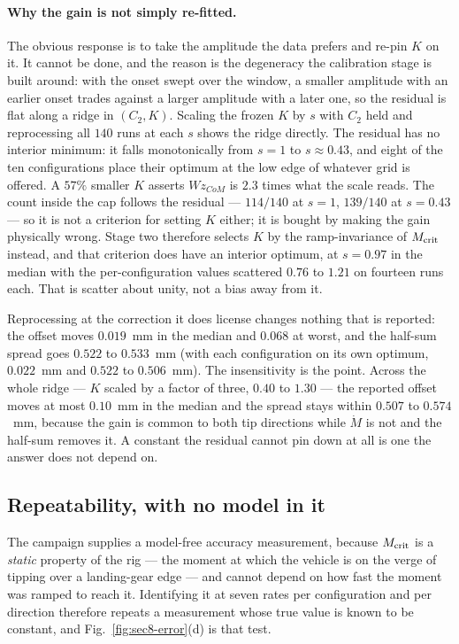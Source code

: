 \documentclass[10pt]{article}
\newcommand{\Mdot}{\dot M}
\begin{document}
\paragraph{Why the gain is not simply re-fitted.} The obvious response is
to take the amplitude the data prefers and re-pin $K$ on it. It cannot
be done, and the reason is the degeneracy the calibration stage is built
around: with the onset swept over the window, a smaller amplitude with an
earlier onset trades against a larger amplitude with a later one, so the
residual is flat along a ridge in $(C_2,K)$. Scaling the frozen $K$ by
$s$ with $C_2$ held and reprocessing all $140$ runs at each $s$ shows the
ridge directly. The residual has no interior minimum: it falls
monotonically from $s=1$ to $s\approx0.43$, and eight of the ten
configurations place their optimum at the low edge of whatever grid is
offered. A $57\%$ smaller $K$ asserts $Wz_{CoM}$ is $2.3$ times what the
scale reads. The count inside the cap follows the residual --- $114/140$
at $s=1$, $139/140$ at $s=0.43$ --- so it is not a criterion for setting
$K$ either; it is bought by making the gain physically wrong. Stage two
therefore selects $K$ by the ramp-invariance of $M_{\rm crit}$ instead,
and that criterion does have an interior optimum, at $s=0.97$ in the
median with the per-configuration values scattered $0.76$ to $1.21$ on
fourteen runs each. That is scatter about unity, not a bias away from it.

Reprocessing at the correction it does license changes nothing that is
reported: the offset moves $0.019$~mm in the median and $0.068$ at worst,
and the half-sum spread goes $0.522$ to $0.533$~mm (with each
configuration on its own optimum, $0.022$~mm and $0.522$ to $0.506$~mm).
The insensitivity is the point. Across the whole ridge --- $K$ scaled by
a factor of three, $0.40$ to $1.30$ --- the reported offset moves at most
$0.10$~mm in the median and the spread stays within $0.507$ to
$0.574$~mm, because the gain is common to both tip directions while
$\Mdot$ is not and the half-sum removes it. A constant the residual
cannot pin down at all is one the answer does not depend on.

\subsection{Repeatability, with no model in it}

The campaign supplies a model-free accuracy measurement, because
$M_{\rm crit}$ is a \emph{static} property of the rig --- the moment at
which the vehicle is on the verge of tipping over a landing-gear edge
--- and cannot depend on how fast the moment was ramped to reach it.
Identifying it at seven rates per configuration and per direction
therefore repeats a measurement whose true value is known to be
constant, and Fig.~\ref{fig:sec8-error}(d) is that test.
\end{document}
